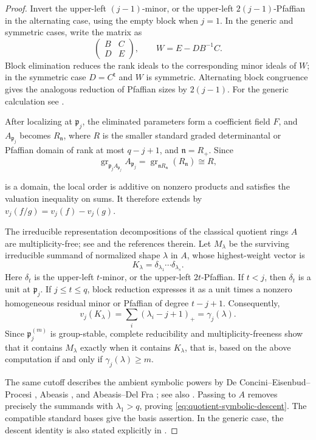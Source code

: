 \documentclass[11pt,reqno]{amsart}
\numberwithin{equation}{subsection}
\theoremstyle{definition}
\theoremstyle{remark}
\newcommand{\fp}{\mathfrak p}
\renewcommand{\l}{\lambda}
\begin{document}
\begin{proof}
Invert the upper-left $(j-1)$-minor, or the upper-left
$2(j-1)$-Pfaffian in the alternating case, using the empty
block when $j=1$. In the generic and symmetric cases, write
the matrix as
\[
 \begin{pmatrix}B&C\\ D&E\end{pmatrix},
 \qquad W=E-DB^{-1}C.
\]
Block elimination reduces the rank ideals to the corresponding
minor ideals of $W$; in the symmetric case $D=C^{\mathsf t}$
and $W$ is symmetric. Alternating block congruence gives the
analogous reduction of Pfaffian sizes by $2(j-1)$.
For the generic calculation see
\cite[Proposition~2.4]{BrunsVetter}.

After localizing at $\fp_j$, the eliminated parameters form
a coefficient field $F$, and $A_{\fp_j}$ becomes
$R_{\mathfrak n}$, where $R$ is the smaller standard graded
determinantal or Pfaffian domain of rank at most $q-j+1$,
and $\mathfrak n=R_+$.
Since
\[
\operatorname{gr}_{\fp_jA_{\fp_j}}A_{\fp_j}= \operatorname{gr}_{\mathfrak nR_{\mathfrak n}}
       (R_{\mathfrak n})\cong R,
\]

is a domain,
the local order is additive on nonzero products and satisfies
the valuation inequality on sums. It therefore extends by
$v_j(f/g)=v_j(f)-v_j(g)$.


The irreducible representation decompositions of the classical quotient rings $A$ are multiplicity-free;
see \cite[Sections~2.3--2.5]{HenriquesVarbaro} and the references
therein. Let $M_\lambda$ be the surviving irreducible summand
of normalized shape $\lambda$ in $A$, whose highest-weight vector is
\[
 K_\lambda=\delta_{\lambda_1}\cdots\delta_{\lambda_s}.
\]
Here $\delta_t$ is the upper-left $t$-minor, or the upper-left
$2t$-Pfaffian. If $t<j$, then $\delta_t$ is a unit at $\fp_j$.
If $j\le t\le q$, block reduction expresses it as a unit times
a nonzero homogeneous residual minor or Pfaffian of degree
$t-j+1$. Consequently,
\begin{equation}\label{eq:highest-weight-order}
 v_j(K_\lambda)
 =\sum_i(\lambda_i-j+1)_+
 =\gamma_j(\lambda).
\end{equation}
Since $\fp_j^{(m)}$ is group-stable, complete reducibility
and multiplicity-freeness show that it contains $M_\lambda$
exactly when it contains $K_\l$, that is, based on the above computation
if and only if 
 $\gamma_j(\lambda)\ge m$.

The same cutoff describes the ambient symbolic powers by
De Concini--Eisenbud--Procesi
\cite[Theorem~7.1]{DEP}, Abeasis
\cite[Theorem~5.1]{Abeasis}, and Abeasis--Del Fra
\cite[Theorem~5.1]{AbeasisDelFra}; see also
\cite[Theorems~2.1,~2.6, and~2.9]{HenriquesVarbaro}.
Passing to $A$ removes precisely the summands with
$\lambda_1>q$, proving \eqref{eq:quotient-symbolic-descent}.
The compatible standard bases give the basis assertion.
In the generic case, the descent identity is also stated
explicitly in \cite[Remark~10.5]{BrunsVetter}.
\end{proof}
\end{document}
